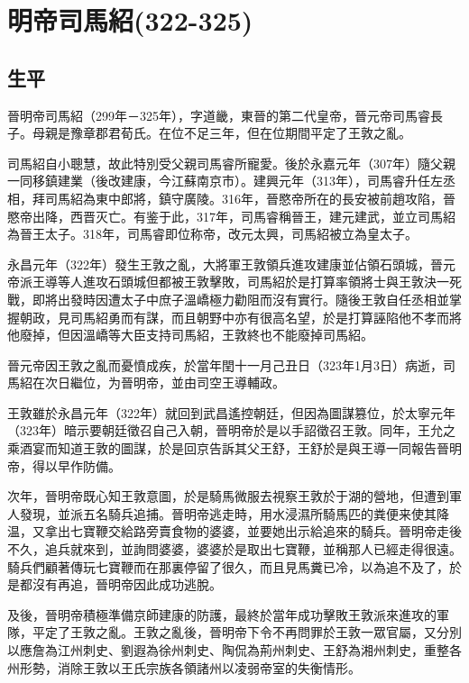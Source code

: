 
\section{明帝司馬紹\tiny(322-325)}

\subsection{生平}

晉明帝司馬紹（299年－325年），字道畿，東晉的第二代皇帝，晉元帝司馬睿長子。母親是豫章郡君荀氏。在位不足三年，但在位期間平定了王敦之亂。

司馬紹自小聰慧，故此特別受父親司馬睿所寵愛。後於永嘉元年（307年）隨父親一同移鎮建業（後改建康，今江蘇南京市）。建興元年（313年），司馬睿升任左丞相，拜司馬紹為東中郎將，鎮守廣陵。316年，晉愍帝所在的長安被前趙攻陷，晉愍帝出降，西晋灭亡。有鉴于此，317年，司馬睿稱晉王，建元建武，並立司馬紹為晉王太子。318年，司馬睿即位称帝，改元太興，司馬紹被立為皇太子。

永昌元年（322年）發生王敦之亂，大將軍王敦領兵進攻建康並佔領石頭城，晉元帝派王導等人進攻石頭城但都被王敦擊敗，司馬紹於是打算率領將士與王敦決一死戰，即將出發時因遭太子中庶子溫嶠極力勸阻而沒有實行。隨後王敦自任丞相並掌握朝政，見司馬紹勇而有謀，而且朝野中亦有很高名望，於是打算誣陷他不孝而將他廢掉，但因溫嶠等大臣支持司馬紹，王敦終也不能廢掉司馬紹。

晉元帝因王敦之亂而憂憤成疾，於當年閏十一月己丑日（323年1月3日）病逝，司馬紹在次日繼位，为晉明帝，並由司空王導輔政。

王敦雖於永昌元年（322年）就回到武昌遙控朝廷，但因為圖謀篡位，於太寧元年（323年）暗示要朝廷徵召自己入朝，晉明帝於是以手詔徵召王敦。同年，王允之乘酒宴而知道王敦的圖謀，於是回京告訴其父王舒，王舒於是與王導一同報告晉明帝，得以早作防備。

次年，晉明帝既心知王敦意圖，於是騎馬微服去視察王敦於于湖的營地，但遭到軍人發現，並派五名騎兵追捕。晉明帝逃走時，用水浸濕所騎馬匹的粪便来使其降温，又拿出七寶鞭交給路旁賣食物的婆婆，並要她出示給追來的騎兵。晉明帝走後不久，追兵就來到，並詢問婆婆，婆婆於是取出七寶鞭，並稱那人已經走得很遠。騎兵們顧著傳玩七寶鞭而在那裏停留了很久，而且見馬糞已冷，以為追不及了，於是都沒有再追，晉明帝因此成功逃脫。

及後，晉明帝積極準備京師建康的防護，最終於當年成功擊敗王敦派來進攻的軍隊，平定了王敦之亂。王敦之亂後，晉明帝下令不再問罪於王敦一眾官屬，又分別以應詹為江州刺史、劉遐為徐州刺史、陶侃為荊州刺史、王舒為湘州刺史，重整各州形勢，消除王敦以王氏宗族各領諸州以凌弱帝室的失衡情形。


